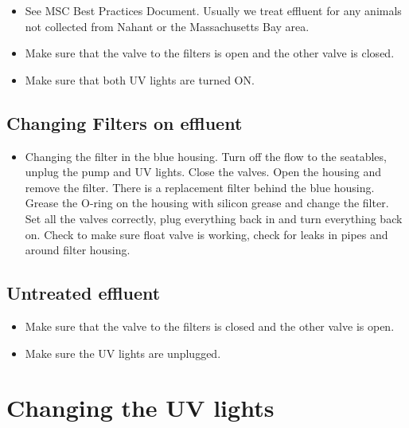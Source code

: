 \documentclass[
  letterpaper,
  DIV=11,
  numbers=noendperiod]{scrreprt}
\providecommand{\tightlist}{%
  \setlength{\itemsep}{0pt}\setlength{\parskip}{0pt}}\usepackage{longtable,booktabs,array}
\begin{document}
\begin{itemize}
\item
  See MSC Best Practices Document. Usually we treat effluent for any
  animals not collected from Nahant or the Massachusetts Bay area.
\item
  Make sure that the valve to the filters is open and the other valve is
  closed.
\item
  Make sure that both UV lights are turned ON.
\end{itemize}

\hypertarget{changing-filters-on-effluent}{%
\subsection*{\texorpdfstring{\textbf{Changing Filters on
effluent}}{Changing Filters on effluent}}\label{changing-filters-on-effluent}}

\begin{itemize}
\tightlist
\item
  Changing the filter in the blue housing. Turn off the flow to the
  seatables, unplug the pump and UV lights. Close the valves. Open the
  housing and remove the filter. There is a replacement filter behind
  the blue housing. Grease the O-ring on the housing with silicon grease
  and change the filter. Set all the valves correctly, plug everything
  back in and turn everything back on. Check to make sure float valve is
  working, check for leaks in pipes and around filter housing.
\end{itemize}

\hypertarget{untreated-effluent}{%
\subsection*{\texorpdfstring{\textbf{Untreated
effluent}}{Untreated effluent}}\label{untreated-effluent}}

\begin{itemize}
\item
  Make sure that the valve to the filters is closed and the other valve
  is open.
\item
  Make sure the UV lights are unplugged.
\end{itemize}

\hypertarget{changing-the-uv-lights}{%
\section*{\texorpdfstring{\textbf{Changing the UV
lights}}{Changing the UV lights}}\label{changing-the-uv-lights}}
\end{document}
